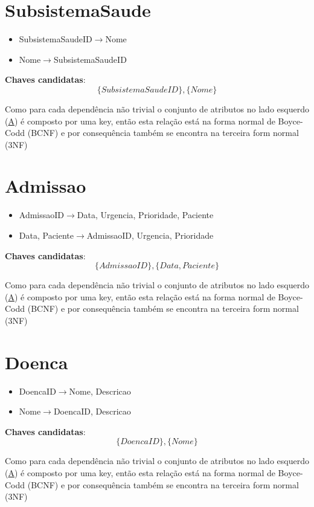 \documentclass[article, a4paper, 12pt, oneside]{memoir}
\begin{document}
\section*{SubsistemaSaude}
\begin{itemize}
	\item SubsistemaSaudeID$\rightarrow$Nome
	\item Nome$\rightarrow$SubsistemaSaudeID
\end{itemize}

\textbf{Chaves candidatas}:\\
\[
\{ SubsistemaSaudeID \}, \{ Nome \}
\]

Como para cada dependência não trivial o conjunto de atributos no lado esquerdo (\underline{A}) é composto por uma key, então esta relação está na forma normal de Boyce-Codd (BCNF) e por consequência também se encontra na terceira form normal (3NF)

\section*{Admissao}
\begin{itemize}
	\item AdmissaoID$\rightarrow$Data, Urgencia, Prioridade, Paciente
	\item Data, Paciente$\rightarrow$AdmissaoID, Urgencia, Prioridade
\end{itemize}

\textbf{Chaves candidatas}:\\
\[
\{ AdmissaoID \}, \{ Data, Paciente \}
\]

Como para cada dependência não trivial o conjunto de atributos no lado esquerdo (\underline{A}) é composto por uma key, então esta relação está na forma normal de Boyce-Codd (BCNF) e por consequência também se encontra na terceira form normal (3NF)

\section*{Doenca}
\begin{itemize}
	\item DoencaID$\rightarrow$Nome, Descricao
	\item Nome$\rightarrow$DoencaID, Descricao
\end{itemize}

\textbf{Chaves candidatas}:\\
\[
\{ DoencaID \}, \{ Nome \}
\]

Como para cada dependência não trivial o conjunto de atributos no lado esquerdo (\underline{A}) é composto por uma key, então esta relação está na forma normal de Boyce-Codd (BCNF) e por consequência também se encontra na terceira form normal (3NF)
\end{document}
